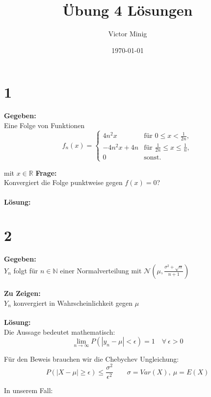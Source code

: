 \documentclass{article}
\begin{document}
\title{Übung 4 Lösungen}
\author{Victor Minig}
\date{\today}
\maketitle

\section*{1}

\textbf{Gegeben:} \\

Eine Folge von Funktionen
\[f_n(x) = \begin{cases}
    4n^2x &\text{für } 0 \leq x < \frac{1}{2n},\\
    -4n^2x + 4n &\text{für } \frac{1}{2n} \leq x \leq \frac{1}{n}, \\
    0 &\text{sonst.} 
\end{cases}\]

mit $x\in\mathbb{R}$ 
\textbf{Frage:}\\

Konvergiert die Folge punktweise gegen $f(x) = 0$? \\ \\
\textbf{Lösung:}\\

\section*{2}
\textbf{Gegeben:}\\

$Y_n$ folgt für $n \in \mathbb{N}$ einer Normalverteilung mit $\mathcal{N}(\mu, \frac{\sigma^2 + \sqrt{n}}{n+1})$ \\ \\
\textbf{Zu Zeigen:}\\

$Y_n$ konvergiert in Wahrscheinlichkeit gegen $\mu$\\ \\
\textbf{Lösung:}\\

Die Aussage bedeutet mathematisch:
\[\lim_{n\rightarrow \infty}P(|y_n - \mu|< \epsilon) = 1 \quad \forall ~\epsilon > 0\]

Für den Beweis brauchen wir die Chebychev Ungleichung:
\[P(|X - \mu| \geq \epsilon) \leq \frac{\sigma^2}{\epsilon^2} \qquad \sigma = Var(X),~ \mu = E(X) \]

In unserem Fall:
\end{document}
